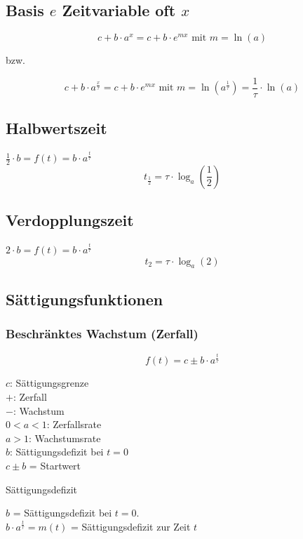 \begin{multicols}{2}
\subsection*{Basis $e$ Zeitvariable oft $x$}

$$c+b\cdot{}a^x = c + b\cdot{}e^{mx} \textrm{ mit } m = \ln(a)$$

bzw.

$$c+b\cdot{}a^\frac{x}\tau = c+b\cdot{}e^{mx} \textrm{ mit }
m=\ln\left(a^\frac1\tau\right) = \frac1\tau \cdot{}\ln(a)$$

\subsection*{Halbwertszeit}
$\frac12 \cdot{} b = f(t) = b\cdot{}a^{\frac{t}{\tau}}$
$$t_{\frac12} = \tau\cdot{}\log_a\left(\frac12\right)$$

\subsection*{Verdopplungszeit}
$2\cdot{}b = f(t) = b\cdot{}a^{\frac{t}{\tau}}$
$$t_{2} = \tau\cdot{}\log_a(2)$$

\subsection*{Sättigungsfunktionen}



\subsubsection*{Beschränktes Wachstum (Zerfall)}

$$f(t) = c \pm{} b\cdot{}a^\frac{t}\tau$$

$c$: Sättigungsgrenze\\
$+$: Zerfall\\
$-$: Wachstum\\
$0<a<1$: Zerfallsrate\\
$a>1$: Wachstumsrate\\
$b$: Sättigungsdefizit bei $t=0$\\
$c\pm b$ = Startwert 



\begin{bemerkung*}{Sättigungsdefizit}{}

$b$ = Sättigungsdefizit bei $t=0$.\\
$b\cdot{}a^\frac{t}\tau = m(t)$ = Sättigungsdefizit zur Zeit $t$
\end{bemerkung*}

\end{multicols}

